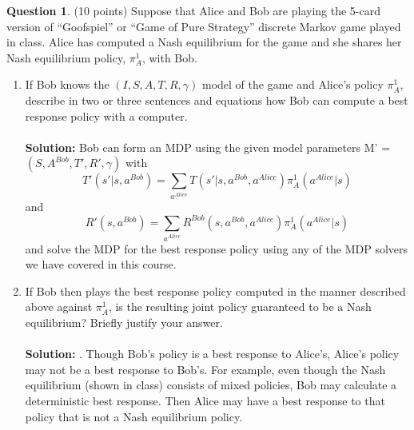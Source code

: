\documentclass{article}
\theoremstyle{definition}
\newtheorem{question}[thm]{Question}
\begin{document}
\begin{question} (10 points)
    Suppose that Alice and Bob are playing the 5-card version of ``Goofspiel'' or ``Game of Pure Strategy'' discrete Markov game played in class. Alice has computed a Nash equilibrium for the game and she shares her Nash equilibrium policy, $\pi^1_A$, with Bob.
    \begin{enumerate}[label=\alph*)]
        \item If Bob knows the $(I, S, A, T, R, \gamma)$ model of the game and Alice's policy $\pi^1_A$, describe in two or three sentences and equations how Bob can compute a best response policy with a computer.
        \\ \\ \noindent \textbf{Solution: } Bob can form an MDP using the given model parameters M' = $(S,A^{Bob},T',R',\gamma)$ with \begin{equation*}
            T'(s'|s,a^{Bob}) = \sum_{a^{Alice}}T(s'|s,a^{Bob},a^{Alice})\pi^1_A(a^{Alice}|s)
        \end{equation*}
        and
        \begin{equation*}
            R'(s, a^{Bob}) = \sum_{a^{Alice}} R^{Bob}(s, a^{Bob}, a^{Alice}) \pi^1_A(a^{Alice} | s)
        \end{equation*}
        and solve the MDP for the best response policy using any of the MDP solvers we have covered in this course.
        \item If Bob then plays the best response policy computed in the manner described above against $\pi^1_A$, is the resulting joint policy guaranteed to be a Nash equilibrium? Briefly justify your answer.
        \\ \\ \noindent \textbf{Solution: } . Though Bob's policy is a best response to Alice's, Alice's policy may not be a best response to Bob's. For example, even though the Nash equilibrium (shown in class) consists of mixed policies, Bob may calculate a deterministic best response. Then Alice may have a best response to that policy that is not a Nash equilibrium policy.\\
    \end{enumerate}
\end{question}
\end{document}

